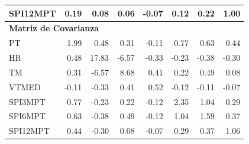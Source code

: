 \begin{table}[ht]
\begin{tabular}{lrrrrrrr}
SPI12MPT & 0.19 & 0.08 & 0.06 & -0.07 & 0.12 & 0.22 & 1.00 \\
\midrule
\multicolumn{8}{l}{\textbf{Matriz de Covarianza}} \\
\midrule
PT       & 1.99 & 0.48 & 0.31 & -0.11 & 0.77 & 0.63 & 0.44 \\
HR       & 0.48 & 17.83 & -6.57 & -0.33 & -0.23 & -0.38 & -0.30 \\
TM       & 0.31 & -6.57 & 8.68 & 0.41 & 0.22 & 0.49 & 0.08 \\
VTMED    & -0.11 & -0.33 & 0.41 & 0.52 & -0.12 & -0.11 & -0.07 \\
SPI3MPT  & 0.77 & -0.23 & 0.22 & -0.12 & 2.35 & 1.04 & 0.29 \\
SPI6MPT  & 0.63 & -0.38 & 0.49 & -0.12 & 1.04 & 1.59 & 0.37 \\
SPI12MPT & 0.44 & -0.30 & 0.08 & -0.07 & 0.29 & 0.37 & 1.06 \\
\bottomrule
\end{tabular}
\end{table}
